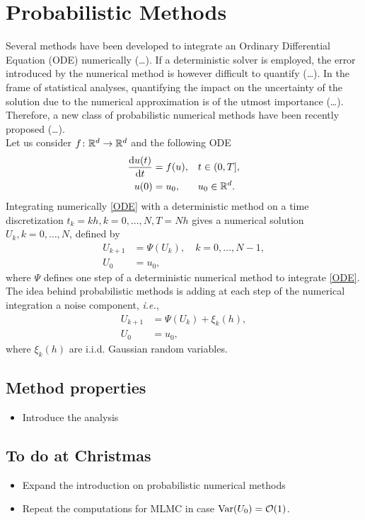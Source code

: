 \section{Probabilistic Methods}

Several methods have been developed to integrate an Ordinary Differential Equation (ODE) numerically (\ldots). If a deterministic solver is employed, the error introduced by the numerical method is however difficult to quantify (\ldots). In the frame of statistical analyses, quantifying the impact on the uncertainty of the solution due to the numerical approximation is of the utmost importance (\ldots). Therefore, a new class of probabilistic numerical methods have been recently proposed \cite{CGS16} (\ldots). \\
Let us consider $f\colon \mathbb{R}^d \to \mathbb{R}^d$ and the following ODE
\begin{equation}\label{ODE}
\begin{aligned}
	\dv{u(t)}{t} &= f(u), &&  t \in (0, T], \\
	u(0) &= u_0, && u_0 \in \mathbb{R}^d.
\end{aligned}
\end{equation}
Integrating numerically \eqref{ODE} with a deterministic method on a time discretization $t_k = kh, k = 0, \ldots, N, T = Nh$ gives a numerical solution $U_k, k = 0, \ldots, N$, defined by
\begin{equation}\label{numericalODE}
\begin{aligned}
	U_{k+1} &= \Psi(U_k), \quad k = 0, \ldots, N-1, \\
	U_{0} &= u_0, 
\end{aligned}
\end{equation}
where $\Psi$ defines one step of a deterministic numerical method to integrate \eqref{ODE}. \\
The idea behind probabilistic methods is adding at each step of the numerical integration a noise component, \textit{i.e.},
\begin{equation}\label{probabilityODE}
\begin{aligned}
	U_{k+1} &= \Psi(U_k) + \xi_k(h), \\
	U_0 &= u_0,
\end{aligned}
\end{equation}
where $\xi_k(h)$ are i.i.d. Gaussian random variables. 




\subsection{Method properties}
\begin{itemize}
	\item Introduce the analysis
\end{itemize}





\subsection{To do at Christmas}
\begin{itemize}
	\item Expand the introduction on probabilistic numerical methods
	\item Repeat the computations for MLMC in case $\operatorname{Var}(U_0) = \mathcal{O}(1)$. 
\end{itemize}

%


